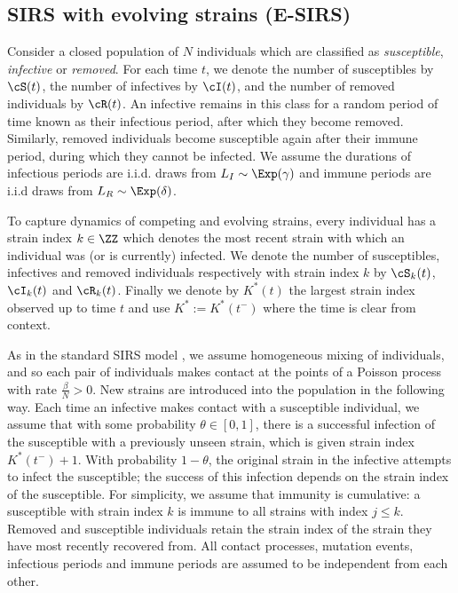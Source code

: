 \documentclass[smallextended]{svjour3}       %
\begin{document}
\subsection{SIRS with evolving strains (E-SIRS)}\label{subsec: sirs}
Consider a closed population of $N$ individuals which are classified as \emph{susceptible}, \emph{infective} or \emph{removed}. For each time $t$, we denote the number of susceptibles by $\cS(t)$, the number of infectives by $\cI(t)$, and the number of removed individuals by $\cR(t)$. An infective remains in this class for a random period of time known as their infectious period, after which they become removed. Similarly, removed individuals become susceptible again after their immune period, during which they cannot be infected.  We assume the durations of infectious periods are i.i.d. draws from $L_I \sim \Exp(\gamma)$ and immune periods are i.i.d draws from $L_R \sim \Exp(\delta)$.

To capture dynamics of competing and evolving strains, every individual has a strain index $k \in \ZZ$ which denotes the most recent strain with which an individual was (or is currently) infected. We denote the number of susceptibles, infectives and removed individuals respectively with strain index $k$ by $\cS_k(t)$, $\cI_k(t)$ and $\cR_k(t)$. Finally we denote by $K^*(t)$ the largest strain index observed up to time $t$ and use $K^* := K^*(t^-)$ where the time is clear from context.

As in the standard SIRS model \cite{nasell2002}, we assume homogeneous mixing of individuals, and so each pair of individuals makes contact at the points of a Poisson process with rate $\frac{\beta}{N} > 0$. New strains are introduced into the population in the following way. Each time an infective makes contact with a susceptible individual, we assume that with some probability $\theta \in [0,1]$, there is a successful infection of the susceptible with a previously unseen strain, which is given strain index $K^*(t^-)+1$. With probability $1-\theta$, the original strain in the infective attempts to infect the susceptible; the success of this infection depends on the strain index of the susceptible. For simplicity, we assume that immunity is cumulative: a susceptible with strain index $k$ is immune to all strains with index $j \leq k$. Removed and susceptible individuals retain the strain index of the strain they have most recently recovered from. All contact processes, mutation events, infectious periods and immune periods are assumed to be independent from each other.
	
\end{document}
